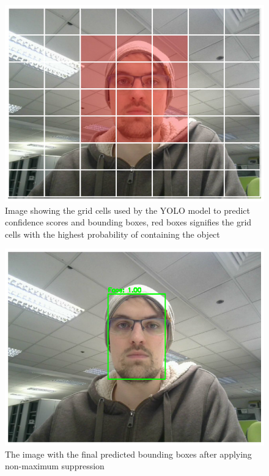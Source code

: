 \begin{figure}[!htb]
    \centering{}
    \includegraphics[scale=0.35]{m+m_images/figure2_grid_highlighted_yolo.png}
    \caption{Image showing the grid cells used by the YOLO model to predict confidence scores and bounding boxes, red boxes signifies the grid cells with the highest probability of containing the object}
    \label{figure:yologrid}
\end{figure}
\begin{figure}[!htb]
    \centering{}
    \includegraphics[scale=0.35]{m+m_images/figure3_detection_yolo.png}
    \caption{The image with the final predicted bounding boxes after applying non-maximum suppression}
    \label{figure:yolodection}
\end{figure}

